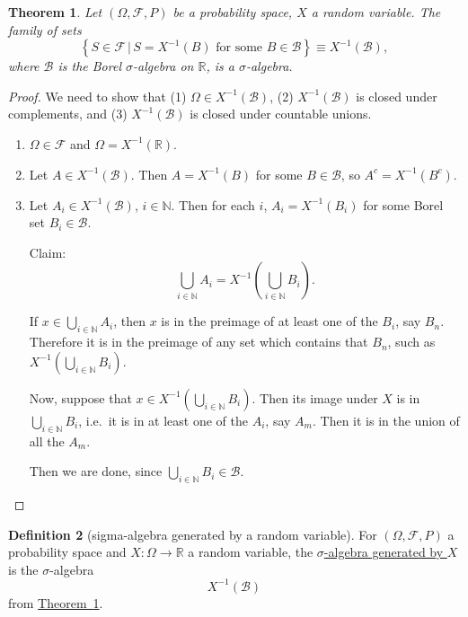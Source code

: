 \documentclass[a4paper,12pt]{scrreprt}
\newcommand{\R}{\mathbb{R}}
\newcommand{\N}{\mathbb{N}}
\newcommand{\defn}[1]{\ul{#1}}
\theoremstyle{definition}
\newtheorem{definition}{Definition}
\theoremstyle{plain}
\newtheorem{theorem}[definition]{Theorem}
\theoremstyle{remark}
\begin{document}
\begin{theorem}
  \label{thm:preimageofsigmaalgebraissigmaalgebra}
  Let $(\Omega, \mathcal{F}, P)$ be a probability space, $X$ a random variable. The family of sets
  \begin{equation*}
    \left\{ S \in \mathcal{F}\,\big|\, S = X^{-1}(B)\text{ for some }B \in \mathcal{B} \right\} \equiv X^{-1}(\mathcal{B}),
  \end{equation*}
  where $\mathcal{B}$ is the Borel $\sigma$-algebra on $\R$, is a $\sigma$-algebra.
\end{theorem}
\begin{proof}
  We need to show that (1) $\Omega \in X^{-1}(\mathcal{B})$, (2) $X^{-1}(\mathcal{B})$ is closed under complements, and (3) $X^{-1}(\mathcal{B})$ is closed under countable unions.
  \begin{enumerate}
    \item $\Omega \in \mathcal{F}$ and $\Omega = X^{-1}(\R)$.

    \item Let $A \in X^{-1}(\mathcal{B})$. Then $A = X^{-1}(B)$ for some $B \in \mathcal{B}$, so $A^{c} = X^{-1}(B^{c})$.

    \item Let $A_{i} \in X^{-1}(\mathcal{B})$, $i \in \N$. Then for each $i$, $A_{i} = X^{-1}(B_{i})$ for some Borel set $B_{i} \in \mathcal{B}$.

      Claim:
      \begin{equation*}
        \bigcup_{i \in \N} A_{i} = X^{-1}\left( \bigcup_{i \in \N} B_{i} \right).
      \end{equation*}

      If $x \in \bigcup_{i \in \N} A_{i}$, then $x$ is in the preimage of at least one of the $B_{i}$, say $B_{n}$. Therefore it is in the preimage of any set which contains that $B_{n}$, such as $X^{-1}\left( \bigcup_{i \in \N}B_{i} \right)$.

      Now, suppose that $x \in X^{-1}\left( \bigcup_{i \in \N} B_{i} \right)$. Then its image under $X$ is in $\bigcup_{i \in \N} B_{i}$, i.e.\ it is in at least one of the $A_{i}$, say $A_{m}$. Then it is in the union of all the $A_{m}$.

      Then we are done, since $\bigcup_{i \in \N} B_{i} \in \mathcal{B}$.
  \end{enumerate}
\end{proof}

\begin{definition}[sigma-algebra generated by a random variable]
  \label{def:sigmaalgebrageneratedbyarandomvariable}
  For $(\Omega, \mathcal{F}, P)$ a probability space and $X\colon \Omega \to \R$ a random variable, the \defn{$\sigma$-algebra generated by $X$} is the $\sigma$-algebra
  \begin{equation*}
    X^{-1}(\mathcal{B})
  \end{equation*}
  from \hyperref[thm:preimageofsigmaalgebraissigmaalgebra]{Theorem~\ref*{thm:preimageofsigmaalgebraissigmaalgebra}}.
\end{definition}
\end{document}
